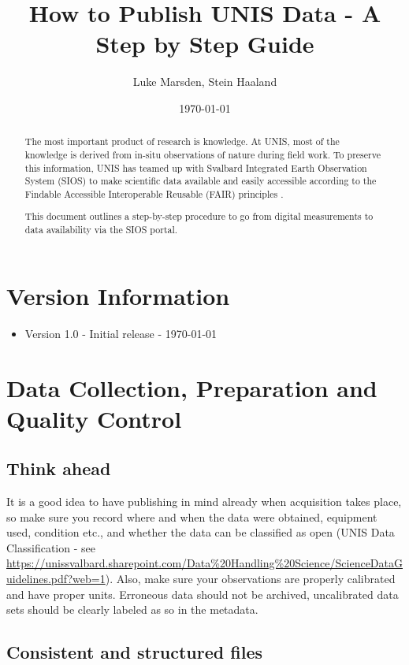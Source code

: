 \documentclass[a4paper,12pt]{article}
\title{How to Publish UNIS Data - A Step by Step Guide}
\author{
    Luke Marsden, Stein Haaland \\
    \emailauthors
}
\date{\today}
\begin{document}
\maketitle

\begin{abstract}
The most important product of research is knowledge. At UNIS, most of the knowledge is derived from in-situ observations of nature during field work. To preserve this information, UNIS has teamed up with Svalbard Integrated Earth Observation System (SIOS) to make scientific data available and easily accessible according to the Findable Accessible Interoperable Reusable (FAIR) principles \citep{wilkinson2016fair}.

This document outlines a step-by-step procedure to go from digital measurements to data availability via the SIOS portal.
\end{abstract}

\tableofcontents

\section*{Version Information}
\label{sec:version-info}
\begin{itemize}
    \item Version 1.0 - Initial release - \today
\end{itemize}

\newpage

\section{Data Collection, Preparation and Quality Control}
\label{sec:data-collection-quality-control}

\subsection{Think ahead}
It is a good idea to have publishing in mind already when acquisition takes place, so make sure you record where and when the data were obtained, equipment used, condition etc., and whether the data can be classified as open (UNIS Data Classification - see \url{https://unissvalbard.sharepoint.com/Data%20Handling%20Science/ScienceDataGuidelines.pdf?web=1}). Also, make sure your observations are properly calibrated and have proper units. Erroneous data should not be archived, uncalibrated data sets should be clearly labeled as so in the metadata. 

\subsection{Consistent and structured files}
\end{document}
